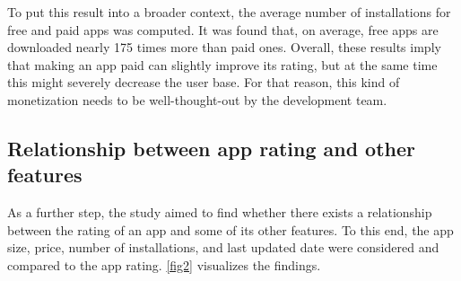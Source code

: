 \documentclass{article}
\begin{document}
To put this result into a broader context, the average number of installations for free and paid apps was computed. It was found that, on average, free apps are downloaded nearly 175 times more than paid ones. Overall, these results imply that making an app paid can slightly improve its rating, but at the same time this might severely decrease the user base. For that reason, this kind of monetization needs to be well-thought-out by the development team.


\subsection{Relationship between app rating and other features}
\label{other_features}

As a further step, the study aimed to find whether there exists a relationship between the rating of an app and some of its other features. To this end, the app size, price, number of installations, and last updated date were considered and compared to the app rating. \cref{fig2} visualizes the findings. 
\end{document}

